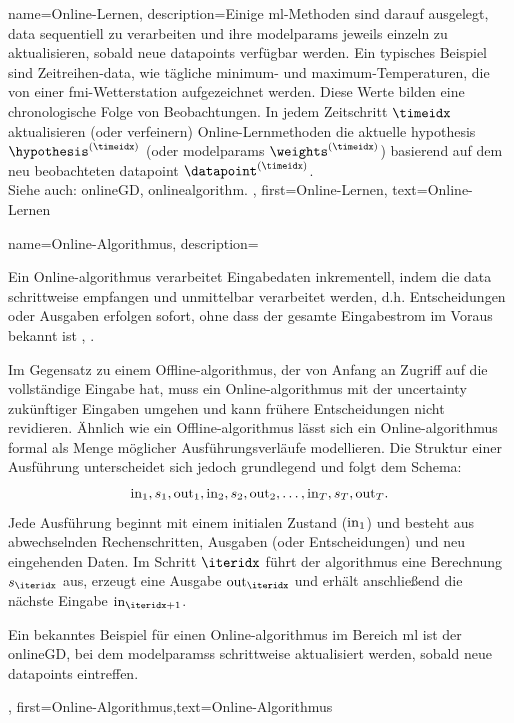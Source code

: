 {{{
{name={Online-Lernen},
	description={Einige \gls{ml}-Methoden sind darauf ausgelegt, \gls{data} 
		sequentiell zu verarbeiten und ihre \glspl{modelparam} jeweils einzeln zu aktualisieren, sobald neue \glspl{datapoint} verfügbar werden. 
		Ein typisches Beispiel sind Zeitreihen-\gls{data}, wie tägliche \gls{minimum}- und \gls{maximum}-Temperaturen, 
		die von einer \gls{fmi}-Wetterstation aufgezeichnet werden. Diese Werte bilden eine chronologische Folge von Beobachtungen. 
		In jedem Zeitschritt $\timeidx$ aktualisieren (oder verfeinern) Online-Lernmethoden die aktuelle \gls{hypothesis} 
		$\hypothesis^{(\timeidx)}$ (oder \glspl{modelparam} $\weights^{(\timeidx)}$) basierend auf dem neu beobachteten \gls{datapoint} 
		$\datapoint^{(\timeidx)}$.
		\\ 
		Siehe auch: \gls{onlineGD}, \gls{onlinealgorithm}. },
	first={Online-Lernen},
	text={Online-Lernen}
}


{name={Online-Algorithmus},
	description={Ein Online-\gls{algorithmus} verarbeitet Eingabedaten inkrementell, 
		indem die \gls{data} schrittweise empfangen und unmittelbar verarbeitet werden, 
		d.h. Entscheidungen oder Ausgaben erfolgen sofort, ohne dass der gesamte Eingabestrom im Voraus bekannt ist 
		\cite{PredictionLearningGames}, \cite{HazanOCO}. 
		
		Im Gegensatz zu einem Offline-\gls{algorithmus}, der von Anfang an Zugriff auf die vollständige Eingabe hat, 
		muss ein Online-\gls{algorithmus} mit der \gls{uncertainty} zukünftiger Eingaben umgehen und kann frühere 
		Entscheidungen nicht revidieren. Ähnlich wie ein Offline-\gls{algorithmus} lässt sich ein Online-\gls{algorithmus} 
		formal als Menge möglicher Ausführungsverläufe modellieren. Die Struktur einer Ausführung unterscheidet sich jedoch 
		grundlegend und folgt dem Schema:
		\[
		{\rm in}_{1},s_1,{\rm out}_{1},{\rm in}_{2},s_2,{\rm out}_{2},\ldots,{\rm in}_{T},s_T,{\rm out}_{T}.
		\]
		Jede Ausführung beginnt mit einem initialen Zustand (\({\rm in}_{1}\)) und besteht aus abwechselnden 
		Rechenschritten, Ausgaben (oder Entscheidungen) und neu eingehenden Daten. 
		Im Schritt \(\iteridx\) führt der \gls{algorithmus} eine Berechnung \(s_{\iteridx}\) aus, 
		erzeugt eine Ausgabe \({\rm out}_{\iteridx}\) und erhält anschließend die nächste Eingabe \({\rm in}_{\iteridx+1}\). 
		
		Ein bekanntes Beispiel für einen Online-\gls{algorithmus} im Bereich \gls{ml} ist der 
		\gls{onlineGD}, bei dem \glspl{modelparams} schrittweise aktualisiert werden, sobald neue 
		\glspl{datapoint} eintreffen.},
	first={Online-Algorithmus},text={Online-Algorithmus} 
}

}}}

